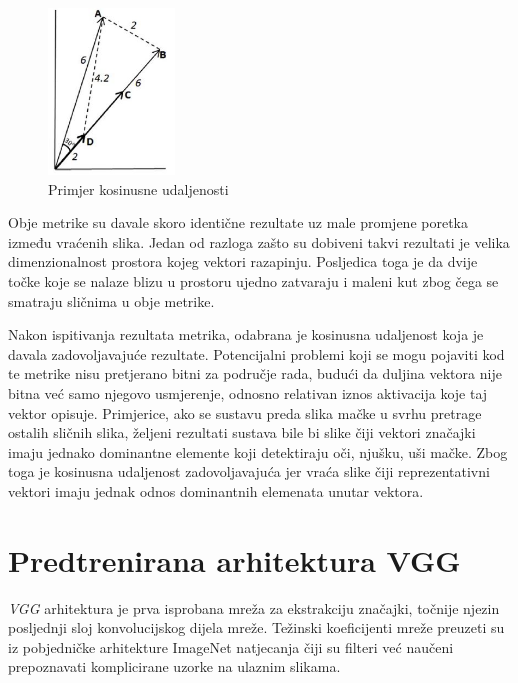 \documentclass[times, utf8, proizvoljni, numeric]{fer}
\begin{document}
\begin{figure}[!ht]
	\begin{center}
		\captionsetup{justification=centering}
		\includegraphics[width=0.3\textwidth]{./imgs/kosinusna_udaljenost.png}
		\caption{Primjer kosinusne udaljenosti \cite{VectorSimilarity}}
		\label{fg:kosinusna_udaljenost}
	\end{center}
\end{figure}

Obje metrike su davale skoro identične rezultate uz male promjene poretka između vraćenih slika. Jedan od razloga zašto su dobiveni takvi rezultati je velika dimenzionalnost prostora kojeg vektori razapinju. Posljedica toga je da dvije točke koje se nalaze blizu u prostoru ujedno zatvaraju i maleni kut zbog čega se smatraju sličnima u obje metrike.	

Nakon ispitivanja rezultata metrika, odabrana je kosinusna udaljenost koja je davala zadovoljavajuće rezultate. Potencijalni problemi koji se mogu pojaviti kod te metrike nisu pretjerano bitni za područje rada, budući da duljina vektora nije bitna već samo njegovo usmjerenje, odnosno relativan iznos aktivacija koje taj vektor opisuje. Primjerice, ako se sustavu preda slika mačke u svrhu pretrage ostalih sličnih slika, željeni rezultati sustava bile bi slike čiji vektori značajki imaju jednako dominantne elemente koji detektiraju oči, njušku, uši mačke. Zbog toga je kosinusna udaljenost zadovoljavajuća jer vraća slike čiji reprezentativni vektori imaju jednak odnos dominantnih elemenata unutar vektora.


\section{Predtrenirana arhitektura VGG}

\textit{VGG} arhitektura je prva isprobana mreža za ekstrakciju značajki, točnije njezin posljednji sloj konvolucijskog dijela mreže. Težinski koeficijenti mreže preuzeti su iz pobjedničke arhitekture ImageNet natjecanja čiji su filteri već naučeni prepoznavati komplicirane uzorke na ulaznim slikama.
\end{document}
